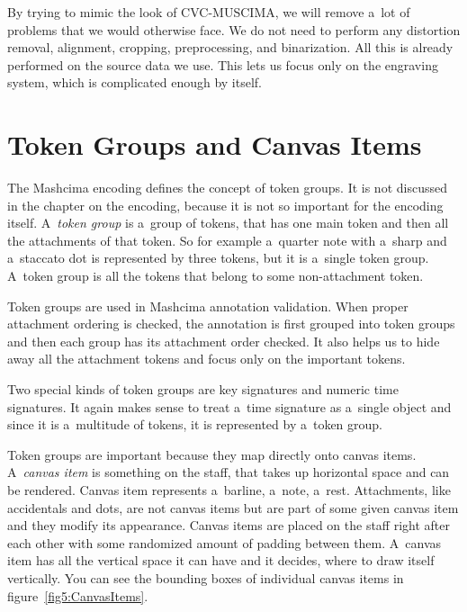 By trying to mimic the look of CVC-MUSCIMA, we will remove a~lot of problems that we would otherwise face. We do not need to perform any distortion removal, alignment, cropping, preprocessing, and binarization. All this is already performed on the source data we use. This lets us focus only on the engraving system, which is complicated enough by itself.


\section{Token Groups and Canvas Items}

The Mashcima encoding defines the concept of token groups. It is not discussed in the chapter on the encoding, because it is not so important for the encoding itself. A~\emph{token group} is a~group of tokens, that has one main token and then all the attachments of that token. So for example a~quarter note with a~sharp and a~staccato dot is represented by three tokens, but it is a~single token group. A~token group is all the tokens that belong to some non-attachment token.

Token groups are used in Mashcima annotation validation. When proper attachment ordering is checked, the annotation is first grouped into token groups and then each group has its attachment order checked. It also helps us to hide away all the attachment tokens and focus only on the important tokens.

Two special kinds of token groups are key signatures and numeric time signatures. It again makes sense to treat a~time signature as a~single object and since it is a~multitude of tokens, it is represented by a~token group.

Token groups are important because they map directly onto canvas items. A~\emph{canvas item} is something on the staff, that takes up horizontal space and can be rendered. Canvas item represents a~barline, a~note, a~rest. Attachments, like accidentals and dots, are not canvas items but are part of some given canvas item and they modify its appearance. Canvas items are placed on the staff right after each other with some randomized amount of padding between them. A~canvas item has all the vertical space it can have and it decides, where to draw itself vertically. You can see the bounding boxes of individual canvas items in figure~\ref{fig5:CanvasItems}.

